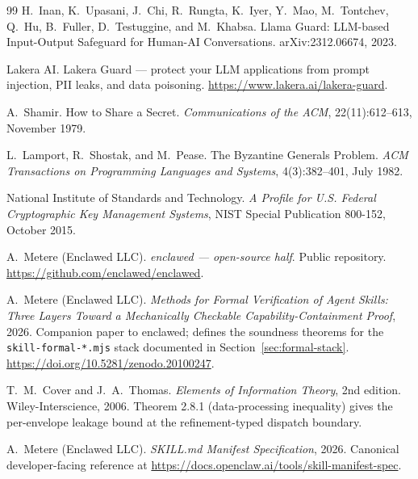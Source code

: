 \documentclass[11pt]{article}
\begin{document}
\begin{thebibliography}{99}
H.~Inan, K.~Upasani, J.~Chi, R.~Rungta, K.~Iyer, Y.~Mao, M.~Tontchev,
Q.~Hu, B.~Fuller, D.~Testuggine, and M.~Khabsa.
Llama Guard: LLM-based Input-Output Safeguard for Human-AI
Conversations.
arXiv:2312.06674, 2023.

Lakera AI.
Lakera Guard --- protect your LLM applications from prompt injection,
PII leaks, and data poisoning.
\url{https://www.lakera.ai/lakera-guard}.

A.~Shamir.
How to Share a Secret.
\emph{Communications of the ACM}, 22(11):612--613, November 1979.

L.~Lamport, R.~Shostak, and M.~Pease.
The Byzantine Generals Problem.
\emph{ACM Transactions on Programming Languages and Systems},
4(3):382--401, July 1982.

National Institute of Standards and Technology.
\emph{A Profile for U.S. Federal Cryptographic Key Management Systems},
NIST Special Publication 800-152, October 2015.

A.~Metere (Enclawed LLC).
\emph{enclawed --- open-source half}. Public repository.
\url{https://github.com/enclawed/enclawed}.

A.~Metere (Enclawed LLC).
\emph{Methods for Formal Verification of Agent Skills: Three Layers
Toward a Mechanically Checkable Capability-Containment Proof}, 2026.
Companion paper to enclawed; defines the soundness theorems for the
\texttt{skill-formal-*.mjs} stack documented in
Section~\ref{sec:formal-stack}.
\url{https://doi.org/10.5281/zenodo.20100247}.

T.~M.~Cover and J.~A.~Thomas.
\emph{Elements of Information Theory}, 2nd edition.
Wiley-Interscience, 2006. Theorem 2.8.1 (data-processing inequality)
gives the per-envelope leakage bound at the refinement-typed dispatch
boundary.

A.~Metere (Enclawed LLC).
\emph{SKILL.md Manifest Specification}, 2026. Canonical
developer-facing reference at
\url{https://docs.openclaw.ai/tools/skill-manifest-spec}.

\end{thebibliography}
\end{document}
